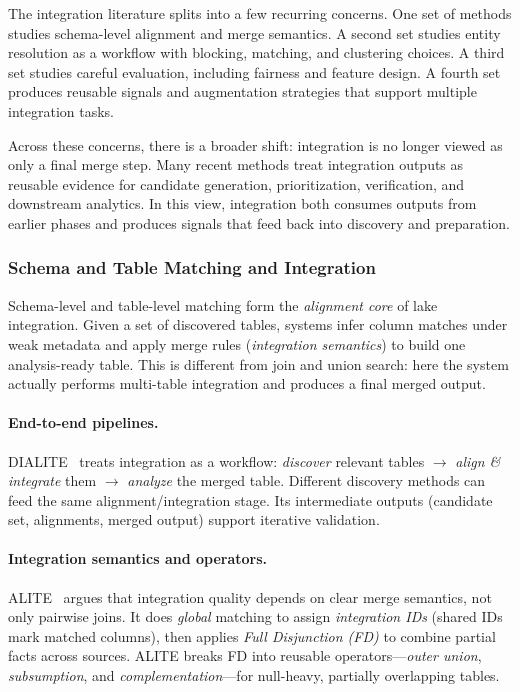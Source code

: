 \documentclass[sigconf,nonacm]{acmart}
\begin{document}
The integration literature splits into a few recurring concerns. One set of methods studies schema-level alignment and merge semantics. A second set studies entity resolution as a workflow with blocking, matching, and clustering choices. A third set studies careful evaluation, including fairness and feature design. A fourth set produces reusable signals and augmentation strategies that support multiple integration tasks.

Across these concerns, there is a broader shift: integration is no longer viewed as only a final merge step. Many recent methods treat integration outputs as reusable evidence for candidate generation, prioritization, verification, and downstream analytics. In this view, integration both consumes outputs from earlier phases and produces signals that feed back into discovery and preparation.


\subsubsection{Schema and Table Matching and Integration}
\label{sec:lit-sm-integration}

Schema-level and table-level matching form the \emph{alignment core} of lake integration. Given a set of discovered tables, systems infer column matches under weak metadata and apply merge rules (\emph{integration semantics}) to build one analysis-ready table. This is different from join and union search: here the system actually performs multi-table integration and produces a final merged output.

\paragraph{End-to-end pipelines.}
DIALITE~\cite{10.1145/3555041.3589732} treats integration as a workflow:
\emph{discover} relevant tables $\rightarrow$ \emph{align \& integrate} them $\rightarrow$ \emph{analyze} the merged table.
Different discovery methods can feed the same alignment/integration stage.
Its intermediate outputs (candidate set, alignments, merged output) support iterative validation.

\paragraph{Integration semantics and operators.}
ALITE~\cite{10.14778/3574245.3574274} argues that integration quality depends on clear merge semantics, not only pairwise joins.
It does \emph{global} matching to assign \emph{integration IDs} (shared IDs mark matched columns), then applies
\emph{Full Disjunction (FD)} to combine partial facts across sources.
ALITE breaks FD into reusable operators---\emph{outer union}, \emph{subsumption}, and \emph{complementation}---for null-heavy, partially overlapping tables.
\end{document}
